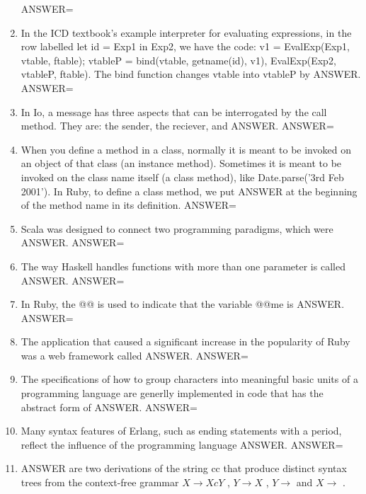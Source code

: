 \documentclass{exam}
\begin{document}
\begin{enumerate}
ANSWER=
\item In the ICD textbook's example interpreter for evaluating expressions, in the row labelled let id = Exp1 in Exp2, we have the code: v1 = EvalExp(Exp1, vtable, ftable); vtableP = bind(vtable, getname(id), v1), EvalExp(Exp2, vtableP, ftable).  The bind function changes vtable into vtableP by ANSWER.\newline
ANSWER=
\item In Io, a message has three aspects that can be interrogated by the call method.  They are: the sender, the reciever, and ANSWER.\newline
ANSWER=
\item When you define a method in a class, normally it is meant to be invoked on an object of that class (an instance method).  Sometimes it is meant to be invoked on the class name itself (a class method), like Date.parse('3rd Feb 2001').  In Ruby, to define a class method, we put ANSWER at the beginning of the method name in its definition.\newline
ANSWER=
\item Scala was designed to connect two programming paradigms, which were ANSWER.\newline
ANSWER=
\item The way Haskell handles functions with more than one parameter is called ANSWER.\newline
ANSWER=
\item In Ruby, the @@ is used to indicate that the variable @@me is ANSWER.\newline
ANSWER=
\item The application that caused a significant increase in the popularity of Ruby was a web framework called ANSWER.\newline
ANSWER=
\item The specifications of how to group characters into meaningful basic units of a programming language are generlly implemented in code that has the abstract form of ANSWER.\newline
ANSWER=
\item Many syntax features of Erlang, such as ending statements with a period, reflect the influence of the programming language ANSWER.\newline
ANSWER=
\item ANSWER are two derivations of the string cc that produce distinct syntax trees from the context-free grammar $X \rightarrow X c Y$ , $Y \rightarrow X$ ,  $Y \rightarrow$ and $X \rightarrow$ .\newline

\end{enumerate}
\end{document}
